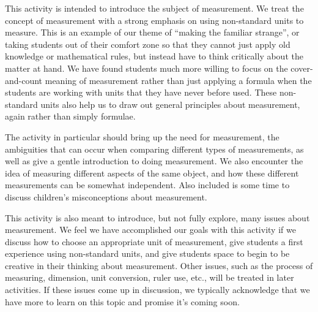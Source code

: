 \documentclass[]{ximera}
\begin{document}
\begin{instructorNotes}

This activity is intended to introduce the subject of measurement. We treat the concept of measurement with a strong emphasis on using non-standard units to measure.  This is an example of our theme of ``making the familiar strange'', or taking students out of their comfort zone so that they cannot just apply old knowledge or mathematical rules, but instead have to think critically about the matter at hand.  We have found students much more willing to focus on the cover-and-count meaning of measurement rather than just applying a formula when the students are working with units that they have never before used.  These non-standard units also help us to draw out general principles about measurement, again rather than simply formulae.

The activity in particular should bring up the need for measurement, the ambiguities that can occur when comparing different types of measurements, as well as give a gentle introduction to doing measurement.  We also encounter the idea of measuring different aspects of the same object, and how these different measurements can be somewhat independent.  Also included is some time to discuss children's misconceptions about measurement.

This activity is also meant to introduce, but not fully explore, many issues about measurement.  We feel we have accomplished our goals with this activity if we discuss how to choose an appropriate unit of measurement, give students a first experience using non-standard units, and give students space to begin to be creative in their thinking about measurement. Other issues, such as the process of measuring, dimension, unit conversion, ruler use, etc., will be treated in later activities.  If these issues come up in discussion, we typically acknowledge that we have more to learn on this topic and promise it's coming soon.


\end{instructorNotes}
\end{document}

